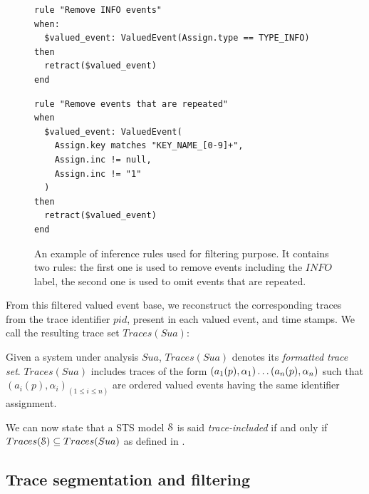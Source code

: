 \begin{figure}[ht]
\begin{framed}
\begin{BVerbatim}
rule "Remove INFO events"
when:
  $valued_event: ValuedEvent(Assign.type == TYPE_INFO)
then
  retract($valued_event)
end
\end{BVerbatim}
\end{framed}

\begin{framed}
\begin{BVerbatim}
rule "Remove events that are repeated"
when
  $valued_event: ValuedEvent(
    Assign.key matches "KEY_NAME_[0-9]+",
    Assign.inc != null,
    Assign.inc != "1"
  )
then
  retract($valued_event)
end
\end{BVerbatim}
\end{framed}

\caption{An example of inference rules used for filtering
purpose. It contains two rules: the first one is used to remove
events including the $INFO$ label, the second one is used to omit
events that are repeated.}
\label{fig:removalrules}
\end{figure}

From this filtered valued event base, we reconstruct the
corresponding traces from the trace identifier $pid$, present in
each valued event, and time stamps. We call the resulting trace
set $Traces(Sua)$:

\begin{definition}
    Given a system under analysis $\mathit{Sua}$, $Traces(Sua)$
    denotes its \emph{formatted trace set}. $Traces(Sua)$
    includes traces of the form $(a_1(p), \alpha_1) \dots\\
    (a_n(p), \alpha_n)$ such that $(a_i(p), \alpha_i)_{(1 \leq i
    \leq n)}$ are ordered valued events having the same
    identifier assignment.

	\label{def:structuredtrace}
\end{definition}

We can now state that a STS model $\EuScript{S}$ is said
\emph{trace-included} if and only if $Traces(\EuScript{S})
\subseteq Traces(Sua)$ as defined in \cite{petrenko06}.

\subsection{Trace segmentation and filtering}
\label{sec:modelinf:prodsystems:segmentation}

